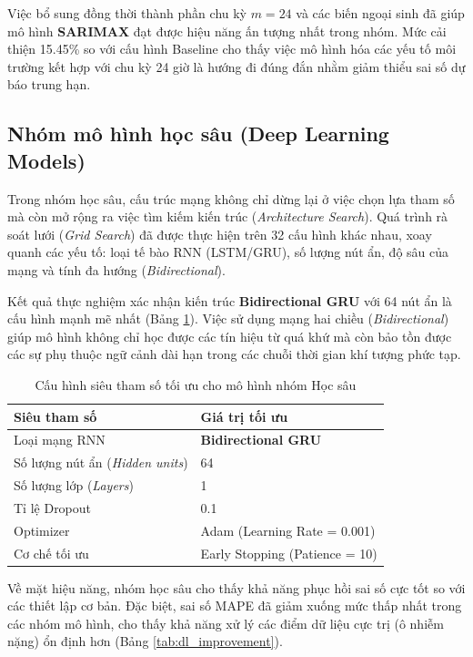 Việc bổ sung đồng thời thành phần chu kỳ $m=24$ và các biến ngoại sinh đã giúp mô hình \textbf{SARIMAX} đạt được hiệu năng ấn tượng nhất trong nhóm. Mức cải thiện 15.45\% so với cấu hình Baseline cho thấy việc mô hình hóa các yếu tố môi trường kết hợp với chu kỳ 24 giờ là hướng đi đúng đắn nhằm giảm thiểu sai số dự báo trung hạn.

\subsection{Nhóm mô hình học sâu (Deep Learning Models)}

Trong nhóm học sâu, cấu trúc mạng không chỉ dừng lại ở việc chọn lựa tham số mà còn mở rộng ra việc tìm kiếm kiến trúc (\textit{Architecture Search}). Quá trình rà soát lưới (\textit{Grid Search}) đã được thực hiện trên 32 cấu hình khác nhau, xoay quanh các yếu tố: loại tế bào RNN (LSTM/GRU), số lượng nút ẩn, độ sâu của mạng và tính đa hướng (\textit{Bidirectional}).

Kết quả thực nghiệm xác nhận kiến trúc \textbf{Bidirectional GRU} với 64 nút ẩn là cấu hình mạnh mẽ nhất (Bảng \ref{tab:dl_best_params}). Việc sử dụng mạng hai chiều (\textit{Bidirectional}) giúp mô hình không chỉ học được các tín hiệu từ quá khứ mà còn bảo tồn được các sự phụ thuộc ngữ cảnh dài hạn trong các chuỗi thời gian khí tượng phức tạp.

\begin{table}[H]
    \centering
    \caption{Cấu hình siêu tham số tối ưu cho mô hình nhóm Học sâu}
    \label{tab:dl_best_params}
    \begin{tabular}{|l|l|}
    \hline
    \textbf{Siêu tham số} & \textbf{Giá trị tối ưu} \\ \hline
    Loại mạng RNN         & \textbf{Bidirectional GRU} \\ \hline
    Số lượng nút ẩn (\textit{Hidden units}) & 64 \\ \hline
    Số lượng lớp (\textit{Layers})          & 1 \\ \hline
    Tỉ lệ Dropout                          & 0.1 \\ \hline
    Optimizer                              & Adam (Learning Rate = 0.001) \\ \hline
    Cơ chế tối ưu                          & Early Stopping (Patience = 10) \\ \hline
    \end{tabular}
\end{table}

Về mặt hiệu năng, nhóm học sâu cho thấy khả năng phục hồi sai số cực tốt so với các thiết lập cơ bản. Đặc biệt, sai số MAPE đã giảm xuống mức thấp nhất trong các nhóm mô hình, cho thấy khả năng xử lý các điểm dữ liệu cực trị (ô nhiễm nặng) ổn định hơn (Bảng \ref{tab:dl_improvement}).

